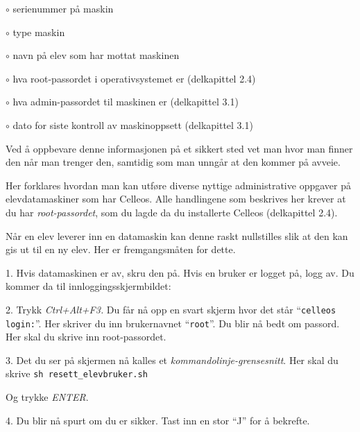\smallskip
\item{$\circ$} serienummer p\aa{} maskin
\item{$\circ$} type maskin
\item{$\circ$} navn p\aa{} elev som har mottat maskinen
\item{$\circ$} hva root-passordet i operativsystemet er (delkapittel 2.4)
\item{$\circ$} hva admin-passordet til maskinen er (delkapittel 3.1)
\item{$\circ$} dato for siste kontroll av maskinoppsett (delkapittel 3.1)

\smallskip
Ved \aa{} oppbevare denne informasjonen p\aa{} et sikkert sted vet man hvor man finner den n\aa r man trenger den, samtidig som man unng\aa r at den kommer p\aa{} avveie.

\vfill\eject

\topglue 1pc


Her forklares hvordan man kan utf\o re diverse nyttige administrative oppgaver p\aa{} elevdatamaskiner som har Celleos. Alle handlingene som beskrives her krever at du har {\it root-passordet}, som du lagde da du installerte Celleos (delkapittel 2.4).


N\aa r en elev leverer inn en datamaskin kan denne raskt nullstilles slik at den kan gis ut til en ny elev. Her er fremgangsm\aa ten for dette.
\item{1.} Hvis datamaskinen er av, skru den p\aa . Hvis en bruker er logget p\aa , logg av. Du kommer da til inn\-loggings\-skjerm\-bildet:

\medskip

\smallskip
\item{2.} Trykk {\it Ctrl+Alt+F3.} Du f\aa r n\aa{} opp en svart skjerm hvor det st\aa r ``{\tt celleos login:}''. Her skriver du inn brukernavnet ``{\tt root}''. Du blir n\aa{} bedt om passord. Her skal du skrive inn root-passordet.

\item{3.} Det du ser p\aa{} skjermen n\aa{} kalles et {\it kommando\-linje-grense\-snitt}. Her skal du skrive
\medskip
{\tt sh resett\_elevbruker.sh}
\medskip
\item{} Og trykke {\it ENTER}.
\medskip
\item{4.} Du blir n\aa{} spurt om du er sikker. Tast inn en stor ``J'' for \aa{} bekrefte.

